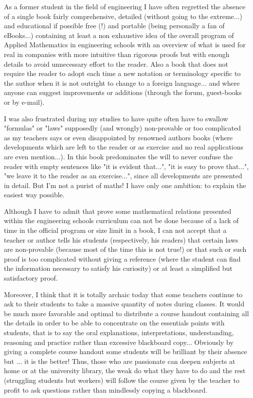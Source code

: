 	As a former student in the field of engineering I have often regretted the absence of a single book fairly comprehensive, detailed (without going to the extreme...) and educational if possible free (!) and portable (being personally a fan of eBooks...) containing at least a non exhaustive idea of the overall program of Applied Mathematics in engineering schools with an overview of what is used for real in companies with more intuitive than rigorous proofs but with enough details to avoid unnecessary effort to the reader. Also a book that does not require the reader to adopt each time a new notation or terminology specific to the author when it is not outright to change to a foreign language... and where anyone can suggest improvements or additions (through the forum, guest-books or by e-mail).

	I was also frustrated during my studies to have quite often have to swallow "formulas" or "laws" supposedly (and wrongly) non-provable or too complicated as my teachers says or even disappointed by renowned authors books (where developments which are left to the reader or as exercise and no real applications are even mention...). In this book predominates the will to never confuse the reader with empty sentences like "it is evident that...", "it is easy to prove that...", "we leave it to the reader as an exercise...", since all developments are presented in detail. But I'm not a purist of maths! I have only one ambition: to explain the easiest way possible.

	Although I have to admit that prove some mathematical relations presented within the engineering schools curriculum can not be done because of a lack of time in the official program or size limit in a book, I can not accept that a teacher or author tells his students (respectively, his readers) that certain laws are non-provable (because most of the time this is not true!) or that such or such proof is too complicated without giving a reference (where the student can find the information necessary to satisfy his curiosity) or at least a simplified but satisfactory proof.

	Moreover, I think that it is totally archaic today that some teachers continue to ask to their students to take a massive quantity of notes during classes. It would be much more favorable and optimal to distribute a course handout containing all the details in order to be able to concentrate on the essentials points with students, that is to say the oral explanations, interpretations, understanding, reasoning and practice rather than excessive blackboard copy... Obviously by giving a complete course handout some students will be brilliant by their absence but ... it is the better! Thus, those who are passionate can deepen subjects at home or at the university library, the weak do what they have to do and the rest (struggling students but workers) will follow the course given by the teacher to profit to ask questions rather than mindlessly copying a blackboard.

